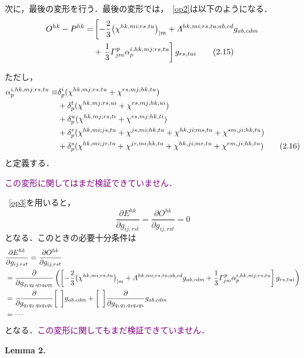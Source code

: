 \documentclass[main]{subfiles}
\begin{document}
次に，最後の変形を行う．最後の変形では，~\eqref{op2}は以下のようになる．
\begin{align*}
    O^{hk}-P^{hk} 
    = &\left[
    - \dfrac{2}{3}{\left( \chi ^{hk,mi;rs,tu} \right)}_{|m}
    + \varLambda^{hk,mi;rs,tu;ab,cd} g_{ab,cdm}  \right.\\
    &+\left.
        \dfrac{1}{3}\varGamma^p_{jm}\alpha _p ^{i,hk,mj;rs,tu}
    \right]g_{rs,tui}
    \label{op3} \tag{2.15}
\end{align*}

ただし，
\begin{align*}
    \alpha _p ^{i,hk,mj;rs,tu} 
    \equiv &\delta ^i_p(\chi^{hk,mj;rs,tu}+ \chi^{rs,mj;hk,tu}) \\
    &+ \delta ^t_p(\chi^{hk,mj;rs,ui}+ \chi^{rs,mj;hk,ui}) \\
    &+ \delta ^u_p(\chi^{hk,mj;rs,ti}+ \chi^{rs,mj;hk,ti}) \\
    &+ \delta ^r_p(\chi^{hk,mi;js,tu}+ \chi^{js,mi;hk,tu} +\chi^{hk,ji;ms,tu}+ \chi^{sm,ji;hk,tu}) \\
    &+ \delta ^s_p(\chi^{hk,mi;jr,tu}+ \chi^{jr,mi;hk,tu} +\chi^{hk,ji;mr,tu}+ \chi^{rm,ji;hk,tu}) 
    \tag{2.16} \label{alpha}
\end{align*}
と定義する．

\textcolor{purple}{この変形に関してはまだ検証できていません．}

~\eqref{op3}を用いると，
\begin{equation*}
    \dfrac{\partial E^{hk}}{\partial g_{ij,rst} }=\dfrac{\partial O^{hk}}{\partial g_{ij,rst} }=0
\end{equation*}
となる．このときの必要十分条件は
\begin{align*}
    &\dfrac{\partial E^{hk}}{\partial g_{ij,rst} }=\dfrac{\partial O^{hk}}{\partial g_{ij,rst} }\\
    &= \dfrac{\partial }{\partial g_{q_1q_2,q_3q_4q_5} }\left( \left[
        - \dfrac{2}{3}{\left( \chi ^{hk,mi;rs,tu} \right)}_{|m}
        + \varLambda^{hk,mi;rs,tu;ab,cd} g_{ab,cdm}  
        + \dfrac{1}{3}\varGamma^p_{jm}\alpha _p ^{i,hk,mj;rs,tu}
        \right] g_{rs,tui} \right)\\
    &= \dfrac{\partial }{\partial g_{q_1q_2,q_3q_4q_5} }\biggl[\:\: \biggr] g_{ab,cdm} 
    +\biggl[\:\: \biggr] \dfrac{\partial }{\partial g_{q_1q_2,q_3q_4q_5} } g_{ab,cdm}\\
    &= \cdots
\end{align*}
となる．\textcolor{purple}{この変形に関してもまだ検証できていません．}

\textbf{Lemma 2.}
\end{document}
